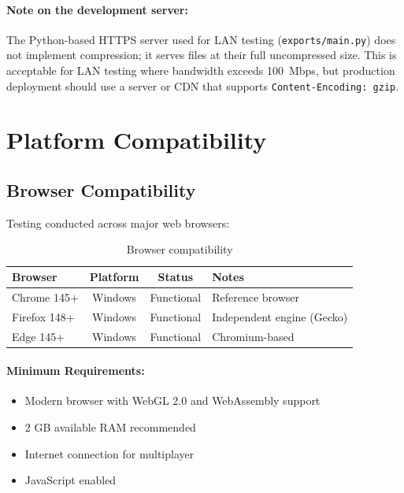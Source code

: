 \paragraph*{Note on the development server:}

The Python-based HTTPS server used for LAN testing (\texttt{exports/main.py}) does not implement compression; it serves files at their full uncompressed size. This is acceptable for LAN testing where bandwidth exceeds 100~Mbps, but production deployment should use a server or CDN that supports \texttt{Content-Encoding: gzip}.

\section{Platform Compatibility}
\label{sec:platform-compatibility}

\subsection{Browser Compatibility}
\label{subsec:browser-compatibility}

Testing conducted across major web browsers:

\begin{table}[htbp]
    \centering
    \caption{Browser compatibility}
    \label{tab:browser-compat}
    \begin{tabular}{@{}lccl@{}}
        \toprule
        \textbf{Browser} & \textbf{Platform} & \textbf{Status} & \textbf{Notes}             \\
        \midrule
        Chrome 145+      & Windows           & Functional      & Reference browser          \\
        Firefox 148+     & Windows           & Functional      & Independent engine (Gecko) \\
        Edge 145+        & Windows           & Functional      & Chromium-based             \\
        \bottomrule
    \end{tabular}
\end{table}

\paragraph*{Minimum Requirements:}

\begin{itemize}
    \item Modern browser with WebGL 2.0 and WebAssembly support
    \item 2 GB available RAM recommended
    \item Internet connection for multiplayer
    \item JavaScript enabled
\end{itemize}

